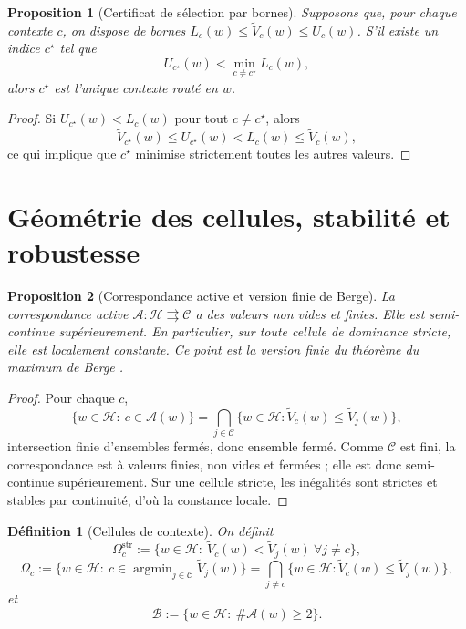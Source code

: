 \documentclass[11pt,a4paper]{article}
\newtheorem{definition}{Définition}[section]
\newtheorem{proposition}{Proposition}[section]
\DeclareMathOperator{\argmin}{argmin}
\newcommand{\Hh}{\mathcal H}
\newcommand{\Ccal}{\mathcal C}
\newcommand{\Acal}{\mathcal A}
\newcommand{\Bcal}{\mathcal B}
\begin{document}
\begin{proposition}[Certificat de sélection par bornes]
Supposons que, pour chaque contexte \(c\), on dispose de bornes \(L_c(w)\le \widetilde V_c(w)\le U_c(w)\). S'il existe un indice \(c^\star\) tel que
\[
U_{c^\star}(w) < \min_{c\neq c^\star} L_c(w),
\]
alors \(c^\star\) est l'unique contexte routé en \(w\).
\end{proposition}

\begin{proof}
Si \(U_{c^\star}(w) < L_c(w)\) pour tout \(c\neq c^\star\), alors
\[
\widetilde V_{c^\star}(w)\le U_{c^\star}(w)<L_c(w)\le \widetilde V_c(w),
\]
ce qui implique que \(c^\star\) minimise strictement toutes les autres valeurs.
\end{proof}

\section{Géométrie des cellules, stabilité et robustesse}

\begin{proposition}[Correspondance active et version finie de Berge]
La correspondance active \(\Acal:\Hh\rightrightarrows\Ccal\) a des valeurs non vides et finies. Elle est semi-continue supérieurement. En particulier, sur toute cellule de dominance stricte, elle est localement constante. Ce point est la version finie du théorème du maximum de Berge \cite{Berge1963}.
\end{proposition}

\begin{proof}
Pour chaque \(c\),
\[
\{w\in\Hh:\ c\in\Acal(w)\}
=\bigcap_{j\in\Ccal}\{w\in\Hh:\widetilde V_c(w)\le \widetilde V_j(w)\},
\]
intersection finie d'ensembles fermés, donc ensemble fermé. Comme \(\Ccal\) est fini, la correspondance est à valeurs finies, non vides et fermées ; elle est donc semi-continue supérieurement. Sur une cellule stricte, les inégalités sont strictes et stables par continuité, d'où la constance locale.
\end{proof}

\begin{definition}[Cellules de contexte]
On définit
\[
\Omega_c^{\mathrm{str}}:=\{w\in\Hh:\ \widetilde V_c(w)<\widetilde V_j(w)\ \forall j\neq c\},
\]
\[
\Omega_c:=\{w\in\Hh:\ c\in\argmin_{j\in\Ccal}\widetilde V_j(w)\}
=\bigcap_{j\neq c}\{w\in\Hh:\widetilde V_c(w)\le \widetilde V_j(w)\},
\]
et
\[
\Bcal:=\{w\in\Hh:\ \#\Acal(w)\ge 2\}.
\]
\end{definition}
\end{document}

